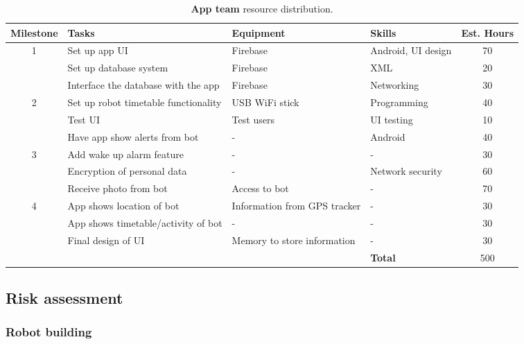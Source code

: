 \documentclass{article}
\begin{document}
\begin{table*}[]
  \begin{center}
  \begin{small}
  \begin{tabular}{|c|l|l|l|c|}
    \hline
    {\bf Milestone} & {\bf Tasks} & {\bf Equipment} & {\bf Skills} & {\bf Est. Hours} \\ \hline
    1               & Set up app UI & Firebase & Android, UI design & 70 \\ \cline{2-5}
                    & Set up database system & Firebase & XML & 20 \\ \cline{2-5}
                    & Interface the database with the app & Firebase & Networking & 30 \\ \hline
    2               & Set up robot timetable functionality & USB WiFi stick & Programming & 40 \\ \cline{2-5}
                    & Test UI & Test users & UI testing & 10 \\ \cline{2-5}
                    & Have app show alerts from bot & - & Android & 40 \\ \hline
    3               & Add wake up alarm feature & - & - & 30 \\ \cline{2-5}
                    & Encryption of personal data & - & Network security & 60 \\ \cline{2-5}
                    & Receive photo from bot & Access to bot & - & 70 \\ \hline
    4               & App shows location of bot & Information from GPS tracker & - & 30 \\ \cline{2-5}
                    & App shows timetable/activity of bot & - & - & 30 \\ \cline{2-5}
                    & Final design of UI & Memory to store information & - & 30 \\ \hline
                    &                           &  & {\bf Total} & 500 \\ \hline
  \end{tabular}
  \end{small}
  \caption{{\bf App team} resource distribution.}
  \end{center}
\end{table*}


\subsection{Risk assessment} 

\subsubsection{Robot building}
\end{document}
